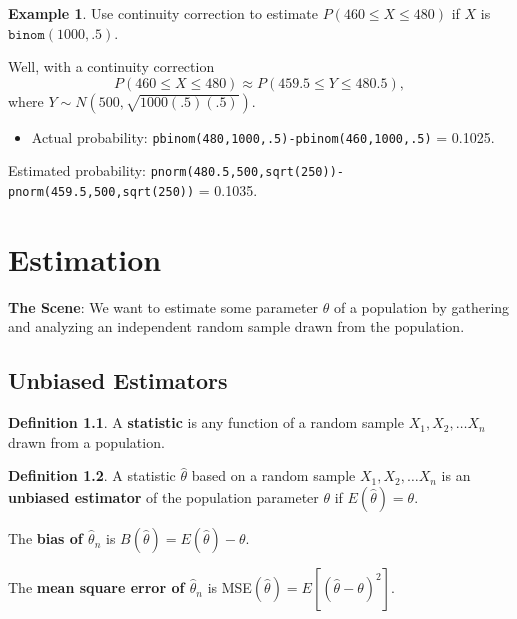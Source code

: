 \documentclass[
]{book}
\providecommand{\tightlist}{%
  \setlength{\itemsep}{0pt}\setlength{\parskip}{0pt}}
\theoremstyle{definition}
\newtheorem{definition}{Definition}[chapter]
\theoremstyle{definition}
\newtheorem{example}{Example}[chapter]
\theoremstyle{definition}
\theoremstyle{definition}
\theoremstyle{remark}
\begin{document}
\begin{example}
Use continuity correction to estimate \(P(460 \leq X \leq 480)\) if \(X\) is \(\texttt{binom}(1000,.5)\).

Well, with a continuity correction
\[P(460 \leq X \leq 480) \approx P(459.5 \leq Y \leq 480.5),\] where \(Y \sim N(500,\sqrt{1000(.5)(.5)})\).

\begin{itemize}
\tightlist
\item
  Actual probability: \texttt{pbinom(480,1000,.5)-pbinom(460,1000,.5)} = 0.1025.
\end{itemize}

Estimated probability: \texttt{pnorm(480.5,500,sqrt(250))-pnorm(459.5,500,sqrt(250))} = 0.1035.
\end{example}

\chapter{Estimation}\label{estimation}

\textbf{The Scene}: We want to estimate some parameter \(\theta\) of a population by gathering and analyzing an independent random sample drawn from the population.

\section{Unbiased Estimators}\label{unbiased-estimators}

\begin{definition}
\protect\hypertarget{def:statistic}{}\label{def:statistic}A \textbf{statistic} is any function of a random sample \(X_1, X_2, \ldots X_n\) drawn from a population.
\end{definition}

\begin{definition}
A statistic \(\hat{\theta}\) based on a random sample \(X_1, X_2, \ldots X_n\) is an \textbf{unbiased estimator} of the population parameter \(\theta\) if \(E(\hat{\theta}) = \theta\).

The \textbf{bias of \(\hat{\theta}_n\)} is \(B(\hat{\theta}) = E(\hat{\theta})-\theta\).

The \textbf{mean square error of \(\hat{\theta}_n\)} is MSE\((\hat{\theta}) = E[(\hat{\theta}-\theta)^2]\).
\end{definition}
\end{document}
